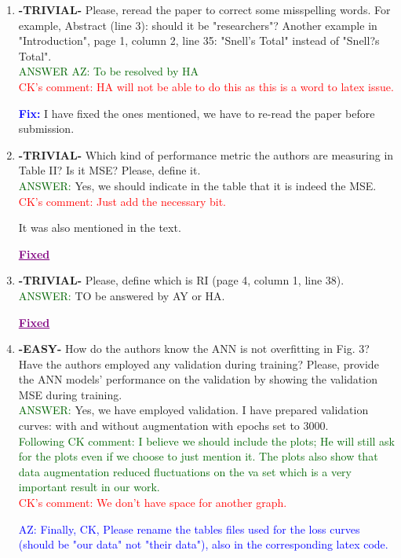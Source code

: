 \documentclass{article}
\newcommand{\fix}{\large \textcolor{blue}{ \textbf{Fix:} }}
\newcommand{\fixed}{\Large \textcolor{purple}{ \underline{\textbf{Fixed}} }}
\begin{document}
\begin{enumerate}
\item \textbf{-TRIVIAL-} Please, reread the paper to correct some misspelling words. For example, Abstract (line 3): should it be "researchers"? Another example in "Introduction", page 1, column 2, line 35: "Snell's Total" instead of "Snell?s Total". \\
\textcolor{darkgreen}{ANSWER AZ: To be resolved by HA} \\ \textcolor{red}{ CK's comment: HA will not be able to do this as this is a word to latex issue.}

\fix I have fixed the ones mentioned, we have to re-read the paper before submission.
    
\item \textbf{-TRIVIAL-} Which kind of performance metric the authors are measuring in Table II? Is it MSE? Please, define it.  \\
\textcolor{darkgreen}{ANSWER: } Yes, we should indicate in the table that it is indeed the MSE. \textcolor{red}{ CK's comment: Just add the necessary bit.}

It was also mentioned in the text.

\fixed

\item \textbf{-TRIVIAL-} Please, define which is RI (page 4, column 1, line 38). \\
\textcolor{darkgreen}{ANSWER: } TO be answered by AY or HA.

\fixed

\item  \textbf{-EASY-} How do the authors know the ANN is not overfitting in Fig. 3? Have the authors employed any validation during training? Please, provide the ANN models' performance on the validation by showing the validation MSE during training. \\
\textcolor{darkgreen}{ANSWER: } Yes, we have employed validation. I have prepared validation curves: with and without augmentation with epochs set to 3000.\\ \textcolor{darkgreen}{ Following CK comment: I believe we should include the plots; He will still ask for the plots even if we choose to just mention it. The plots also show that data augmentation reduced fluctuations on the va set which is a very important result in our work.} \\ \textcolor{red}{CK's comment: We don't have space for another graph.}

\textcolor{blue}{AZ: Finally, CK, Please rename the tables files used for the loss curves (should be "our data" not "their data"), also in the corresponding latex code.}


\end{enumerate}
\end{document}
